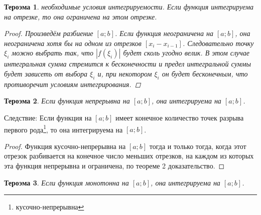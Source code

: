 \documentclass[oneside]{book}
\newtheorem{thm}{Тероэма}[chapter] %
\begin{document}
\begin{enumerate}
\begin{itemize}
\begin{enumerate}
\begin{thm}
  необходимые условия интегрируемости. Если функция интегрируема на отрезке, то она ограничена на этом отрезке.
  \begin{proof}
    Произведём разбиение $[a;b]$. Если функция неограничена на $[a;b]$, она неограничена хотя бы на одном из отрезков $[x_i - x_{i-1}]$.
    Следовательно точку $\xi_i$ можно выбрать так, что  $|f(\xi_i)|$ будет сколь угодно велик. В этом случае интегральная сумма стремится
    к бесконечности и предел интегральной суммы будет зависеть от выбора $\xi_i$ и, при некотором $\xi_i$ он будет бесконечным,
    что противоречит условиям интегрирования.
  \end{proof}
\end{thm}

\begin{thm}
  Если функция непрерывна на $[a;b]$, она интегрируема на $[a;b]$.
\end{thm}
Следствие: Если функция на $[a;b]$ имеет конечное количество точек разрыва первого рода\footnote{кусочно-непрерывна}, то она интегрируема на $[a;b]$.
\begin{proof}
  Функция кусочно-непрерывна на $[a;b]$ тогда и только тогда, когда этот отрезок разбивается на конечное число меньших отрезков,
  на каждом из которых эта функция непрерывна и ограничена, по теореме 2 доказательство.
\end{proof}

\begin{thm}
  Если функция монотонна на $[a;b]$, она интегрируема на $[a;b]$.
\end{thm}


\end{enumerate}
\end{itemize}
\end{enumerate}
\end{document}
